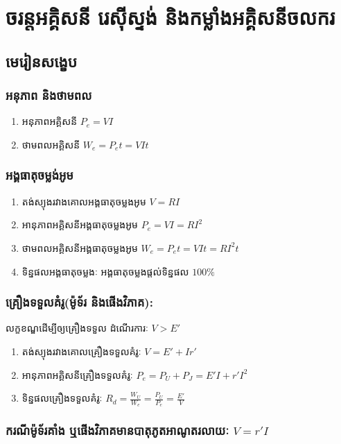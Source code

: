 \chapter{ចរន្តអគ្គិសនី រេស៊ីស្ទង់ និងកម្លាំងអគ្គិសនីចលករ}
\section{មេរៀនសង្ខេប}
\subsection{អនុភាព និងថាមពល}
\begin{enumerate}[m,2]
	\item អនុភាពអគ្គិសនី $P_{e}=VI$
	\item ថាមពលអគ្គិសនី $W_{e}=P_{e}t=VIt$
\end{enumerate}
\subsection{អង្គធាតុចម្លង់អូម}
\begin{enumerate}[m]
	\item តង់ស្យុងរវាងគោលអង្គធាតុចម្លងអូម $V=RI$
	\item អានុភាពអគ្គិសនីអង្គធាតុចម្លងអូម $P_{e}=VI=RI^{2}$
	\item ថាមពលអគ្គិសនីអង្គធាតុចម្លងអូម $W_{e}=P_{e}t=VIt=RI^{2}t$
	\item ទិន្នផលអង្គធាតុចម្លងៈ អង្គធាតុចម្លងផ្តល់ទិន្នផល $100\%$
\end{enumerate}
\subsection{គ្រឿងទទួលគំរូ(ម៉ូទ័រ និងផើងវិភាគ):} លក្ខខណ្ឌដើម្បីឲ្យគ្រឿងទទួល ដំណើរការៈ $V>E'$
\begin{enumerate}
	\item តង់ស្យុងរវាងគោលគ្រឿងទទួលគំរូៈ $V=E'+Ir'$
	\item អានុភាពអគ្គិសនីគ្រឿងទទួលគំរូៈ $P_{e}=P_{U}+P_{J}=E'I+r'I^{2}$
	\item ទិន្នផលគ្រឿងទទួលគំរូៈ $R_{d}=\frac{W_{U}}{W_{e}}=\frac{P_{U}}{P_{e}}=\frac{E'}{V}$
\end{enumerate}
\subsection{ករណីម៉ូទ័រគាំង ឬផើងវិភាគមានបាតុភូតអាណូតរលាយៈ  $V=r'I$}
